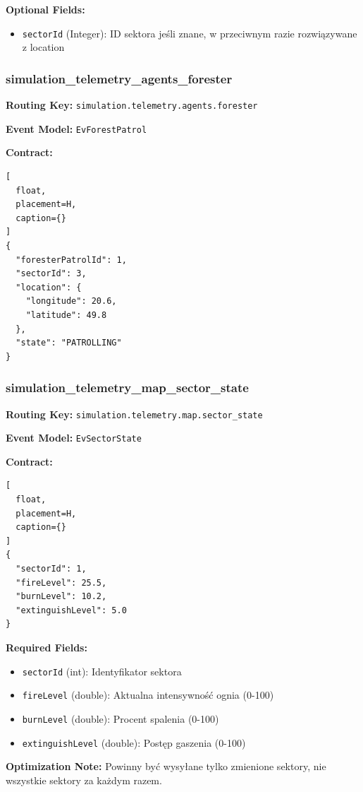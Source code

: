 \textbf{Optional Fields:}
\begin{itemize}
    \item \texttt{sectorId} (Integer): ID sektora jeśli znane, w przeciwnym razie rozwiązywane z location
\end{itemize}

\subsubsection{simulation\_telemetry\_agents\_forester}

\textbf{Routing Key:} \texttt{simulation.telemetry.agents.forester}

\textbf{Event Model:} \texttt{EvForestPatrol}

\textbf{Contract:}
\begin{lstlisting}[
  float,
  placement=H,
  caption={}
]
{
  "foresterPatrolId": 1,
  "sectorId": 3,
  "location": {
    "longitude": 20.6,
    "latitude": 49.8
  },
  "state": "PATROLLING"
}
\end{lstlisting}

\subsubsection{simulation\_telemetry\_map\_sector\_state}

\textbf{Routing Key:} \texttt{simulation.telemetry.map.sector\_state}

\textbf{Event Model:} \texttt{EvSectorState}

\textbf{Contract:}
\begin{lstlisting}[
  float,
  placement=H,
  caption={}
]
{
  "sectorId": 1,
  "fireLevel": 25.5,
  "burnLevel": 10.2,
  "extinguishLevel": 5.0
}
\end{lstlisting}

\textbf{Required Fields:}
\begin{itemize}
    \item \texttt{sectorId} (int): Identyfikator sektora
    \item \texttt{fireLevel} (double): Aktualna intensywność ognia (0-100)
    \item \texttt{burnLevel} (double): Procent spalenia (0-100)
    \item \texttt{extinguishLevel} (double): Postęp gaszenia (0-100)
\end{itemize}

\textbf{Optimization Note:} Powinny być wysyłane tylko zmienione sektory, nie wszystkie sektory za każdym razem.

